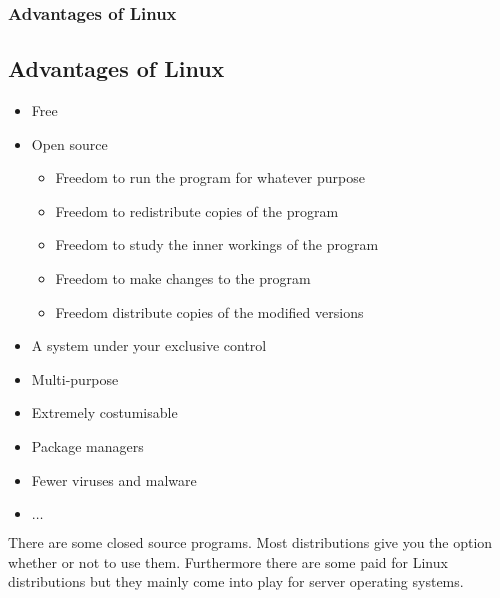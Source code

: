 \begin{frame}
	\frametitle{Advantages of Linux}
	\subsection{Advantages of Linux}
	
	\begin{itemize}
		\item Free
		\item Open source
			\begin{tiny}
				\begin{itemize}
					\item Freedom to run the program for whatever purpose
					\item Freedom to redistribute copies of the program
					\item Freedom to study the inner workings of the program
					\item Freedom to make changes to the program
					\item Freedom distribute copies of the modified versions
				\end{itemize}
			\end{tiny}
		\item A system under your exclusive control
		\item Multi-purpose
		\item Extremely costumisable
		\item Package managers
		\item Fewer viruses and malware
		\item $\dots$
	\end{itemize}

	\vfill
	
	There are some closed source programs. Most distributions give you the option whether or not to use them. Furthermore there are some paid for Linux distributions but they mainly come into play for server operating systems.
\end{frame}
